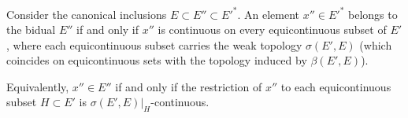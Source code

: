 Consider the canonical inclusions $E \subset E'' \subset E'^*$. An element $x'' \in E'^*$ belongs to the bidual $E''$ if and only if $x''$ is continuous on every equicontinuous subset of $E'$, where each equicontinuous subset carries the weak topology $\sigma(E', E)$ (which coincides on equicontinuous sets with the topology induced by $\beta(E', E)$).

Equivalently, $x'' \in E''$ if and only if the restriction of $x''$ to each equicontinuous subset $H \subset E'$ is $\sigma(E', E)|_H$-continuous.
